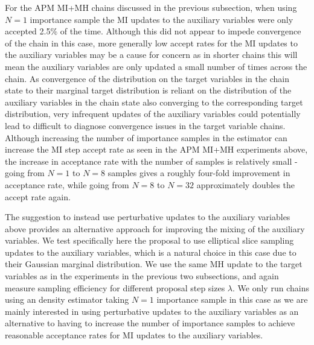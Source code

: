 For the \ac{APM} \ac{MI}+\ac{MH} chains discussed in the previous subsection, when using $N=1$ importance sample the \ac{MI} updates to the auxiliary variables were only accepted 2.5\% of the time. Although this did not appear to impede convergence of the chain in this case, more generally low accept rates for the \ac{MI} updates to the auxiliary variables may be a cause for concern as in shorter chains this will mean the auxiliary variables are only updated a small number of times across the chain. As convergence of the distribution on the target variables in the chain state to their marginal target distribution is reliant on the distribution of the auxiliary variables in the chain state also converging to the corresponding target distribution, very infrequent updates of the auxiliary variables could potentially lead to difficult to diagnose convergence issues in the target variable chains. Although increasing the number of importance samples in the estimator can increase the \ac{MI} step accept rate as seen in the \ac{APM} \ac{MI}+\ac{MH} experiments above, the increase in acceptance rate with the number of samples is relatively small - going from $N=1$ to $N=8$ samples gives a roughly four-fold improvement in acceptance rate, while going from $N=8$ to $N=32$ approximately doubles the accept rate again.

The suggestion to instead use perturbative updates to the auxiliary variables above provides an alternative approach for improving the mixing of the auxiliary variables. We test specifically here the proposal to use elliptical slice sampling updates to the auxiliary variables, which is a natural choice in this case due to their Gaussian marginal distribution. We use the same \ac{MH} update to the target variables as in the experiments in the previous two subsections, and again measure sampling efficiency for different proposal step sizes $\lambda$. We only run chains using an density estimator taking $N=1$ importance sample in this case as we are mainly interested in using perturbative updates to the auxiliary variables as an alternative to having to increase the number of importance samples to achieve reasonable acceptance rates for \ac{MI} updates to the auxiliary variables.

